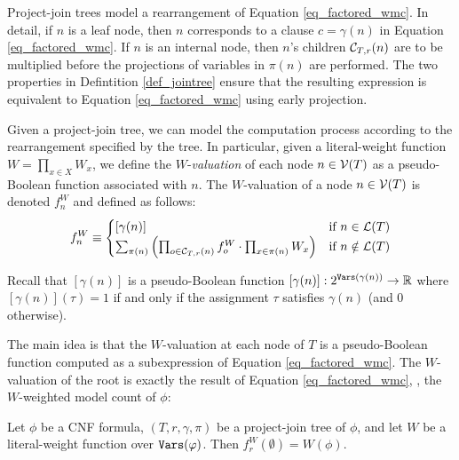 Project-join trees model a rearrangement of Equation \eqref{eq_factored_wmc}.
In detail, if $n$ is a leaf node, then $n$ corresponds to a clause $c = \gamma(n)$ in Equation \eqref{eq_factored_wmc}.
If $n$ is an internal node, then $n$'s children $\mathcal{C}_{T,r}(n)$ are to be multiplied before the projections of variables in $\pi(n)$ are performed.
The two properties in Defintition \ref{def_jointree} ensure that the resulting expression is equivalent to Equation \eqref{eq_factored_wmc} using early projection.

Given a project-join tree, we can model the computation process according to the rearrangement specified by the tree.
In particular, given a literal-weight function $W = \prod_{x \in X} W_x$, we define the $W$-\emph{valuation} of each node $n \in \mathcal{V}(T)$ as a pseudo-Boolean function associated with $n$.
The $W$-valuation of a node $n \in \mathcal{V}(T)$ is denoted $f^W_n$ and defined as follows:
\begin{equation}
\label{eq_valuation}
    f^W_n \equiv
    \begin{cases}
       [\gamma(n)] & \text{if}~n \in \mathcal{L}(T) \\
        \sum_{\pi(n)} \left(  \prod_{o \in \mathcal{C}_{T,r}(n)} f^W_o \cdot \prod_{x \in \pi(n)} W_x  \right) & \text{if}~n \notin \mathcal{L}(T)
    \end{cases}
\end{equation}

Recall that $[\gamma(n)]$ is a pseudo-Boolean function $[\gamma(n)] : 2^{\texttt{\upshape Vars}(\gamma(n))} \rightarrow \mathbb{R}$ where $[\gamma(n)](\tau) = 1$ if and only if the assignment $\tau$ satisfies $\gamma(n)$ (and 0 otherwise).  

The main idea is that the $W$-valuation at each node of $T$ is a pseudo-Boolean function computed as a subexpression of Equation \eqref{eq_factored_wmc}. The $W$-valuation of the root is exactly the result of Equation \eqref{eq_factored_wmc}, \ie, the $W$-weighted model count of $\phi$:
\begin{theorem}
\label{thm_valuation_wmc}
    Let $\phi$ be a CNF formula, $(T, r, \gamma, \pi)$ be a project-join tree of $\phi$, and let $W$ be a literal-weight function over $\texttt{\upshape Vars}(\varphi)$.
    Then $f^W_r(\emptyset) = W(\phi)$.
\end{theorem}

